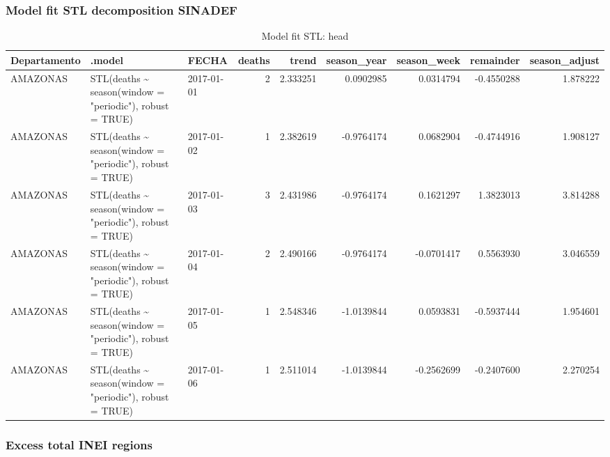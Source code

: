 \documentclass[
]{article}
\begin{document}
\hypertarget{model-fit-stl-decomposition-sinadef}{%
\subsubsection{Model fit STL decomposition SINADEF}\label{model-fit-stl-decomposition-sinadef}}

\begin{table}[!h]

\caption{\label{tab:STLa}Model fit STL: head}
\centering
\begin{tabular}[t]{lllrrrrrr}
\toprule
Departamento & .model & FECHA & deaths & trend & season\_year & season\_week & remainder & season\_adjust\\
\midrule
AMAZONAS & STL(deaths \textasciitilde{} season(window = "periodic"), robust = TRUE) & 2017-01-01 & 2 & 2.333251 & 0.0902985 & 0.0314794 & -0.4550288 & 1.878222\\
AMAZONAS & STL(deaths \textasciitilde{} season(window = "periodic"), robust = TRUE) & 2017-01-02 & 1 & 2.382619 & -0.9764174 & 0.0682904 & -0.4744916 & 1.908127\\
AMAZONAS & STL(deaths \textasciitilde{} season(window = "periodic"), robust = TRUE) & 2017-01-03 & 3 & 2.431986 & -0.9764174 & 0.1621297 & 1.3823013 & 3.814288\\
AMAZONAS & STL(deaths \textasciitilde{} season(window = "periodic"), robust = TRUE) & 2017-01-04 & 2 & 2.490166 & -0.9764174 & -0.0701417 & 0.5563930 & 3.046559\\
AMAZONAS & STL(deaths \textasciitilde{} season(window = "periodic"), robust = TRUE) & 2017-01-05 & 1 & 2.548346 & -1.0139844 & 0.0593831 & -0.5937444 & 1.954601\\
\addlinespace
AMAZONAS & STL(deaths \textasciitilde{} season(window = "periodic"), robust = TRUE) & 2017-01-06 & 1 & 2.511014 & -1.0139844 & -0.2562699 & -0.2407600 & 2.270254\\
\bottomrule
\end{tabular}
\end{table}

\hypertarget{excess-total-inei-regions}{%
\subsubsection{Excess total INEI regions}\label{excess-total-inei-regions}}
\end{document}
